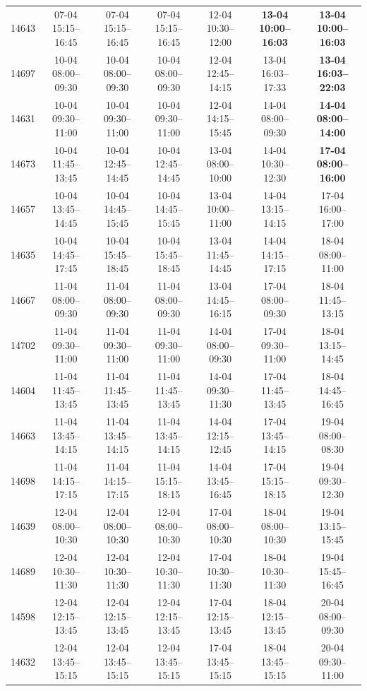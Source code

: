 \begin{table}[htbp]
\begin{tabular}{|r|c|c|c|c|c|c|}
14643 & 07-04 15:15--16:45 & 07-04 15:15--16:45 & 07-04 15:15--16:45 & 12-04 10:30--12:00 & \textbf{13-04 10:00--16:03} & \textbf{13-04 10:00--16:03} \\ 
14697 & 10-04 08:00--09:30 & 10-04 08:00--09:30 & 10-04 08:00--09:30 & 12-04 12:45--14:15 & 13-04 16:03--17:33 & \textbf{13-04 16:03--22:03} \\ 
14631 & 10-04 09:30--11:00 & 10-04 09:30--11:00 & 10-04 09:30--11:00 & 12-04 14:15--15:45 & 14-04 08:00--09:30 & \textbf{14-04 08:00--14:00} \\ 
14673 & 10-04 11:45--13:45 & 10-04 12:45--14:45 & 10-04 12:45--14:45 & 13-04 08:00--10:00 & 14-04 10:30--12:30 & \textbf{17-04 08:00--16:00} \\ 
14657 & 10-04 13:45--14:45 & 10-04 14:45--15:45 & 10-04 14:45--15:45 & 13-04 10:00--11:00 & 14-04 13:15--14:15 & 17-04 16:00--17:00 \\ 
14635 & 10-04 14:45--17:45 & 10-04 15:45--18:45 & 10-04 15:45--18:45 & 13-04 11:45--14:45 & 14-04 14:15--17:15 & 18-04 08:00--11:00 \\ 
14667 & 11-04 08:00--09:30 & 11-04 08:00--09:30 & 11-04 08:00--09:30 & 13-04 14:45--16:15 & 17-04 08:00--09:30 & 18-04 11:45--13:15 \\ 
14702 & 11-04 09:30--11:00 & 11-04 09:30--11:00 & 11-04 09:30--11:00 & 14-04 08:00--09:30 & 17-04 09:30--11:00 & 18-04 13:15--14:45 \\ 
14604 & 11-04 11:45--13:45 & 11-04 11:45--13:45 & 11-04 11:45--13:45 & 14-04 09:30--11:30 & 17-04 11:45--13:45 & 18-04 14:45--16:45 \\ 
14663 & 11-04 13:45--14:15 & 11-04 13:45--14:15 & 11-04 13:45--14:15 & 14-04 12:15--12:45 & 17-04 13:45--14:15 & 19-04 08:00--08:30 \\ 
14698 & 11-04 14:15--17:15 & 11-04 14:15--17:15 & 11-04 15:15--18:15 & 14-04 13:45--16:45 & 17-04 15:15--18:15 & 19-04 09:30--12:30 \\ 
14639 & 12-04 08:00--10:30 & 12-04 08:00--10:30 & 12-04 08:00--10:30 & 17-04 08:00--10:30 & 18-04 08:00--10:30 & 19-04 13:15--15:45 \\ 
14689 & 12-04 10:30--11:30 & 12-04 10:30--11:30 & 12-04 10:30--11:30 & 17-04 10:30--11:30 & 18-04 10:30--11:30 & 19-04 15:45--16:45 \\ 
14598 & 12-04 12:15--13:45 & 12-04 12:15--13:45 & 12-04 12:15--13:45 & 17-04 12:15--13:45 & 18-04 12:15--13:45 & 20-04 08:00--09:30 \\ 
14632 & 12-04 13:45--15:15 & 12-04 13:45--15:15 & 12-04 13:45--15:15 & 17-04 13:45--15:15 & 18-04 13:45--15:15 & 20-04 09:30--11:00 \\ 

\end{tabular}
\end{table}
